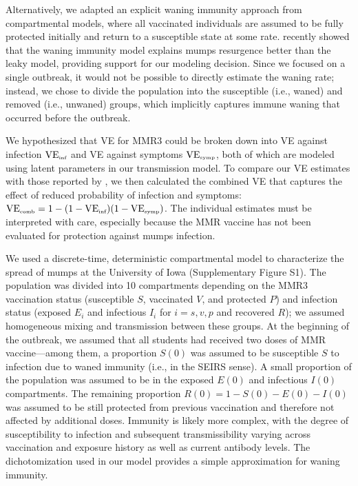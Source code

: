 \documentclass[12pt]{article}
\begin{document}
Alternatively, we adapted an explicit waning immunity approach from compartmental models, where all vaccinated individuals are assumed to be fully protected initially and return to a susceptible state at some rate.
\cite{gokhale2023disentangling} recently showed that the waning immunity model explains mumps resurgence better than the leaky model, providing support for our modeling decision.
Since we focused on a single outbreak, it would not be possible to directly estimate the waning rate;
instead, we chose to divide the population into the susceptible (i.e., waned) and removed (i.e., unwaned) groups, which implicitly captures immune waning that occurred before the outbreak.

We hypothesized that VE for MMR3 could be broken down into VE against infection $\mathrm{VE}_{\textrm{\tiny{inf}}}$ and VE against symptoms $\mathrm{VE}_{\textrm{\tiny{symp}}}$, both of which are modeled using latent parameters in our transmission model.
To compare our VE estimates with those reported by \cite{cardemil2017effectiveness}, we then calculated the combined VE that captures the effect of reduced probability of infection and symptoms: $\mathrm{VE}_{\textrm{\tiny{comb}}} = 1 - (1 - \mathrm{VE}_{\textrm{\tiny{inf}}})(1- \mathrm{VE}_{\textrm{\tiny{symp}}})$.
The individual estimates must be interpreted with care, especially because the MMR vaccine has not been evaluated for protection against mumps infection. 

We used a discrete-time, deterministic compartmental model to characterize the spread of mumps at the University of Iowa (Supplementary Figure S1).
The population was divided into 10 compartments depending on the MMR3 vaccination status (susceptible $S$, vaccinated $V$, and protected $P$) and infection status (exposed $E_i$ and infectious $I_i$ for $i = s, v, p$ and recovered $R$); we assumed homogeneous mixing and transmission between these groups.
At the beginning of the outbreak, we assumed that all students had received two doses of MMR vaccine---among them, a proportion $S(0)$ was assumed to be susceptible $S$ to infection due to waned immunity (i.e., in the SEIRS sense).
A small proportion of the population was assumed to be in the exposed $E(0)$ and infectious $I(0)$ compartments.
The remaining proportion $R(0) = 1-S(0) - E(0) - I(0)$ was assumed to be still protected from previous vaccination and therefore not affected by additional doses.
Immunity is likely more complex, with the degree of susceptibility to infection and subsequent transmissibility varying across vaccination and exposure history as well as current antibody levels.
The dichotomization used in our model provides a simple approximation for waning immunity.
\end{document}
